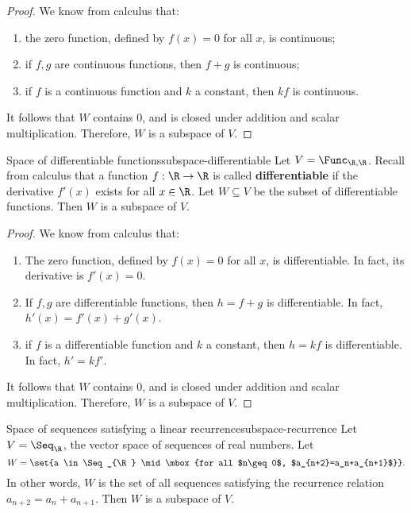 \begin{proof}
  We know from calculus that:
  \begin{enumerate}
  \item the zero function, defined by $f(x)=0$ for all $x$, is
    continuous;
  \item if $f,g$ are continuous functions, then $f+g$ is
    continuous;
  \item if $f$ is a continuous function and $k$ a constant, then $kf$
    is continuous. 
  \end{enumerate}
  It follows that $W$ contains $0$, and is closed under addition and
  scalar multiplication. Therefore, $W$ is a subspace of $V$.
\end{proof}

\begin{example}{Space of differentiable functions}{subspace-differentiable}
  Let $V = \Func_{\R,\R}$. Recall from calculus that a function
  $f:\R\to\R$ is called \textbf{differentiable}%
   if the derivative $f'(x)$ exists for
  all $x\in\R$. Let $W\subseteq V$ be the subset of differentiable
  functions. Then $W$ is a subspace of $V$.
\end{example}

\begin{proof}
  We know from calculus that:
  \begin{enumerate}
  \item The zero function, defined by $f(x)=0$ for all $x$, is
    differentiable. In fact, its derivative is $f'(x) = 0$.
  \item If $f,g$ are differentiable functions, then $h=f+g$ is
    differentiable. In fact, $h'(x) = f'(x) + g'(x)$.
  \item if $f$ is a differentiable function and $k$ a constant, then
    $h=kf$ is differentiable. In fact, $h' = kf'$.
  \end{enumerate}
  It follows that $W$ contains $0$, and is closed under addition and
  scalar multiplication. Therefore, $W$ is a subspace of $V$.
\end{proof}

\begin{example}{Space of sequences satisfying a linear recurrence}{subspace-recurrence}
  Let $V=\Seq_{\R}$, the vector space of sequences of real
  numbers. Let
  \begin{equation*}
    W = \set{a \in \Seq_{\R} \mid \mbox{for all $n\geq 0$, $a_{n+2}=a_n+a_{n+1}$}}.
  \end{equation*}
  In other words, $W$ is the set of all sequences satisfying the
  recurrence relation $a_{n+2}=a_n+a_{n+1}$. Then $W$ is a subspace of $V$.
\end{example}


